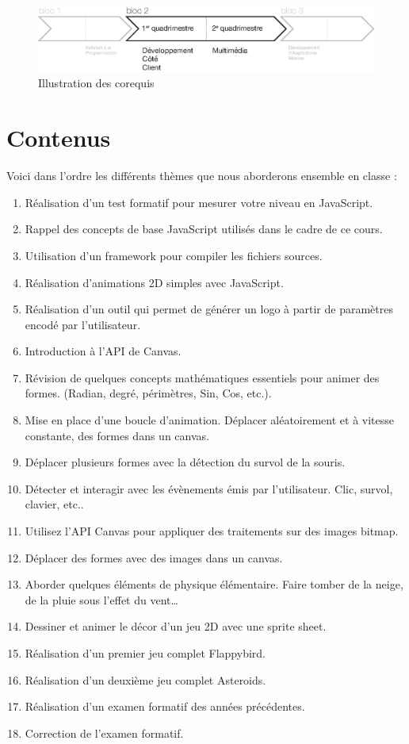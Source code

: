 \begin{figure}[H]
    \begin{center}
        \includegraphics[width=\textwidth]{figures/corequis.eps}
        \caption{Illustration des corequis}
        \label{Fig:GQM}
    \end{center}
\end{figure}
\clearpage

\section{Contenus}

Voici dans l'ordre les différents thèmes que nous aborderons ensemble en classe :
\begin{enumerate}
    \item Réalisation d'un test formatif pour mesurer votre niveau en JavaScript.
    \item Rappel des concepts de base JavaScript utilisés dans le cadre de ce cours.
    \item Utilisation d’un framework pour compiler les fichiers sources.
    \item Réalisation d'animations 2D simples avec JavaScript.
    \item Réalisation d’un outil qui permet de générer un logo à partir de paramètres encodé par l’utilisateur.
    \item Introduction à l’API de Canvas.
    \item Révision de quelques concepts mathématiques essentiels pour animer des formes. (Radian, degré, périmètres, Sin, Cos, etc.).
    \item Mise en place d’une boucle d’animation. Déplacer aléatoirement et à vitesse constante, des formes dans un canvas.
    \item Déplacer plusieurs formes avec la détection du survol de la souris.
    \item Détecter et interagir avec les évènements émis par l'utilisateur. Clic, survol, clavier, etc..
    \item Utilisez l’API Canvas pour appliquer des traitements sur des images bitmap.
    \item Déplacer des formes avec des images dans un canvas.
    \item Aborder quelques éléments de physique élémentaire. Faire tomber de la neige, de la pluie sous l'effet du vent…
    \item Dessiner et animer le décor d’un jeu 2D avec une sprite sheet.
    \item Réalisation d’un premier jeu complet Flappybird.
    \item Réalisation d’un deuxième jeu complet Asteroids.
    \item Réalisation d’un examen formatif des années précédentes.
    \item Correction de l'examen formatif.
\end{enumerate}
